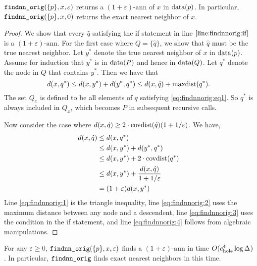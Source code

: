 \documentclass[thesis.tex]{subfiles}
\newcommand{\dist}[2]{\distf({#1},{#2})}
\newcommand{\distf}{d}
\newcommand{\aspect}[1]{\Delta_{#1}}
\newcommand{\cdoub}{c_\textnormal{doub}}
\newcommand{\chole}{c_\textnormal{hole}}
\newcommand{\eann}{(1+\varepsilon)\text{-ann}}
\newcommand{\mkfunction}[1]{\ifmmode{\textnormal{{#1}}}}
\newcommand{\covdist}[1]    {\mkfunction{covdist}({#1})}
\newcommand{\maxdist}[1]    {\mkfunction{maxdist}({#1})}
\newcommand{\data}[1]       {\mkfunction{data}({#1})}
\newcommand{\findnnorig}{\mkprocedure{findnn\_orig}}
\begin{document}
\begin{theorem}
    \label{theorem:findnnorig:correct}
    $\findnnorig(\{p\}, x, \varepsilon)$ returns a $\eann$ of $x$ in $\data{p}$.
    In particular, $\findnnorig(\{p\},x,0)$ returns the exact nearest neighbor of $x$.
\end{theorem}
\begin{proof}
    We show that every $\hat q$ satisfying the if statement in line $\ref{line:findnnorig:if}$ is a $\eann$.
    For the first case where $Q=\{\hat q\}$, 
    we show that $\hat q$ must be the true nearest neighbor.
    Let $y^*$ denote the true nearest neighbor of $x$ in $\data{p}$.
    Assume for induction that $y^*$ is in $\data{P}$ and hence in $\data{Q}$.
    Let $q^*$ denote the node in $Q$ that contains $y^*$.
    Then we have that
    \begin{equation}
        \label{eq:findnnorig:eq1}
        \dist{x}{q^*}
        \le \dist{x}{y^*} + \dist{y^*}{q^*}
        \le \dist{x}{\hat q} + \maxdist{q^*}
        .
    \end{equation}
    The set $Q_x$ is defined to be all elements of $q$ satisfying \eqref{eq:findnnorig:eq1}.
    So $q^*$ is always included in $Q_x$,
    which becomes $P$ in subsequent recursive calls.

    Now consider the case where $\dist{x}{\hat q} \ge 2\cdot\covdist{\hat q}(1+1/\varepsilon)$.
    We have,
    \begin{align}
        \dist{x}{\hat q}
        &\le \dist{x}{q^*}
        \\&\le \dist{x}{y^*} + \dist{y^*}{q^*}
        \label{eq:findnnorig:1}
        \\
        &\le \dist{x}{y^*} + 2\cdot\covdist{q^*}
        \label{eq:findnnorig:2}
        \\
        &\le \dist{x}{y^*} + \frac{\dist{x}{\hat q}}{1+1/\varepsilon}
        \label{eq:findnnorig:3}
        \\
        &= (1+\varepsilon)\dist{x}{y^*}
        \label{eq:findnnorig:4}
    \end{align}
    Line \eqref{eq:findnnorig:1} is the triangle inequality,
    line \eqref{eq:findnnorig:2} uses the maximum distance between any node and a descendent,
    line \eqref{eq:findnnorig:3} uses the condition in the if statement,
    and line \eqref{eq:findnnorig:4} follows from algebraic manipulations.
\end{proof}

\begin{theorem}
    \label{theorem:findnnorig:runtime:approx}
    For any $\varepsilon\ge0$, $\findnnorig(\{p\},x,\varepsilon)$ finds a $\eann$ in time $O(\chole^4\log\aspect{})$.
    In particular, $\findnnorig$ finds exact nearest neighbors in this time.
\end{theorem}
\end{document}

